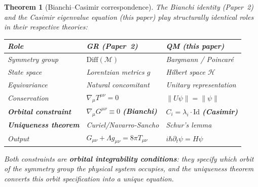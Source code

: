 \documentclass[12pt]{article}
\theoremstyle{plain}
\newtheorem{theorem}{Theorem}[section]
\theoremstyle{definition}
\theoremstyle{remark}
\newcommand{\Diff}{\mathrm{Diff}}
\begin{document}
\begin{theorem}[Bianchi--Casimir correspondence]\label{thm:bianchi-casimir}
The Bianchi identity (Paper~2) and the Casimir eigenvalue equation (this paper) play structurally identical roles in their respective theories:

\begin{center}\small
\begin{tabular}{lll}\toprule
\textbf{Role} & \textbf{GR (Paper~2)} & \textbf{QM (this paper)} \\\midrule
Symmetry group & $\Diff(\mathcal{M})$ & Bargmann / Poincar\'e \\
State space & Lorentzian metrics $g$ & Hilbert space $\mathcal{H}$ \\
Equivariance & Natural concomitant & Unitary representation \\
Conservation & $\nabla_\mu T^{\mu\nu} = 0$ & $\|U\psi\| = \|\psi\|$ \\
\textbf{Orbital constraint} & $\nabla_\mu G^{\mu\nu} \equiv 0$ \textbf{(Bianchi)} & $C_i = \lambda_i \cdot \mathrm{Id}$ \textbf{(Casimir)} \\
\textbf{Uniqueness theorem} & Curiel/Navarro-Sancho & Schur's lemma \\
Output & $G_{\mu\nu} + \Lambda g_{\mu\nu} = 8\pi T_{\mu\nu}$ & $i\hbar\partial_t\psi = H\psi$ \\
\bottomrule
\end{tabular}
\end{center}

Both constraints are \textbf{orbital integrability conditions}: they specify which orbit of the symmetry group the physical system occupies, and the uniqueness theorem converts this orbit specification into a unique equation.
\end{theorem}
\end{document}
